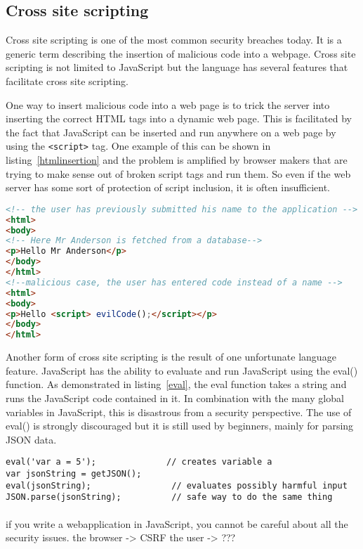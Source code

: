 \subsection{Cross site scripting}
Cross site scripting is one of the most common security breaches today. It is a generic term describing the insertion of malicious code into a webpage. Cross site scripting is not limited to JavaScript but the language has several features that facilitate cross site scripting.

One way to insert malicious code into a web page is to trick the server into inserting the correct HTML tags into a dynamic web page. This is facilitated by the fact that JavaScript can be inserted and run anywhere on a web page by using the \texttt{<script>} tag. One example of this can be shown in listing~\ref{htmlinsertion} and the problem is amplified by browser makers that are trying to make sense out of broken script tags and run them. So even if the web server has some sort of protection of script inclusion, it is often insufficient.
\begin{lstlisting}[caption={Insertion of malicious script on the server side},label={htmlinsertion},language={html}]
<!-- the user has previously submitted his name to the application -->
<html>
<body>
<!-- Here Mr Anderson is fetched from a database-->
<p>Hello Mr Anderson</p> 
</body>
</html>
<!--malicious case, the user has entered code instead of a name -->
<html>
<body>
<p>Hello <script> evilCode();</script></p>
</body>
</html>
\end{lstlisting}

Another form of cross site scripting is the result of one unfortunate language feature. JavaScript has the ability to evaluate and run JavaScript using the eval() function. As demonstrated in listing~\ref{eval}, the eval function takes a string and runs the JavaScript code contained in it. In combination with the many global variables in JavaScript, this is disastrous from a security perspective. The use of eval() is strongly discouraged but it is still used by beginners, mainly for parsing JSON data.
\begin{lstlisting}[caption={Insertion of malicious script on the client side, eval().},label={eval}]
eval('var a = 5');              // creates variable a
var jsonString = getJSON();
eval(jsonString);                // evaluates possibly harmful input
JSON.parse(jsonString);          // safe way to do the same thing
\end{lstlisting}


\paragraph{}
if you write a webapplication in JavaScript, you cannot be careful about all the security issues.
the browser -> CSRF
the user -> ???
